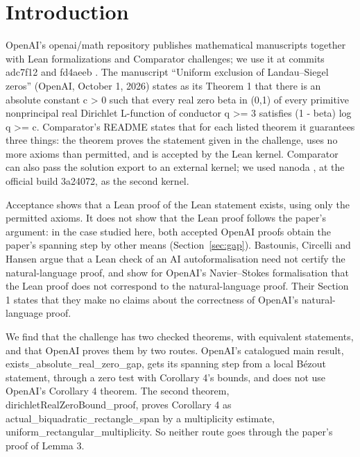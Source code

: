 \section{Introduction}\label{sec:intro}

OpenAI's openai/math repository publishes mathematical manuscripts together with Lean formalizations and Comparator challenges; we use it at commits adc7f12 and fd4aeeb \cite{openai-math-adc7f12,openai-math-fd4aeeb}. %
The manuscript ``Uniform exclusion of Landau--Siegel zeros'' (OpenAI, October 1, 2026) \cite{openai-siegel-2026} states as its Theorem 1 that there is an absolute constant c > 0 such that every real zero beta in (0,1) of every primitive nonprincipal real Dirichlet L-function of conductor q >= 3 satisfies (1 - beta) log q >= c. %
Comparator's README \cite{comparator} states that for each listed theorem it guarantees three things: the theorem proves the statement given in the challenge, uses no more axioms than permitted, and is accepted by the Lean kernel. %
Comparator can also pass the solution export to an external kernel; we used nanoda \cite{nanoda-lib}, at the official build 3a24072, as the second kernel. %

Acceptance shows that a Lean proof of the Lean statement exists, using only the permitted axioms. %
It does not show that the Lean proof follows the paper's argument: in the case studied here, both accepted OpenAI proofs obtain the paper's spanning step by other means (Section~\ref{sec:gap}). %
Bastounis, Circelli and Hansen \cite{bastounis2026} argue that a Lean check of an AI autoformalisation need not certify the natural-language proof, and show for OpenAI's Navier–Stokes formalisation that the Lean proof does not correspond to the natural-language proof. %
Their Section 1 states that they make no claims about the correctness of OpenAI's natural-language proof. %

We find that the challenge has two checked theorems, with equivalent statements, and that OpenAI proves them by two routes. %
OpenAI's catalogued main result, exists\_absolute\_real\_zero\_gap, gets its spanning step from a local B\'ezout statement, through a zero test with Corollary 4's bounds, and does not use OpenAI's Corollary 4 theorem. %
The second theorem, dirichletRealZeroBound\_proof, proves Corollary 4 as actual\_biquadratic\_rectangle\_span by a multiplicity estimate, uniform\_rectangular\_multiplicity. %
So neither route goes through the paper's proof of Lemma 3. %

